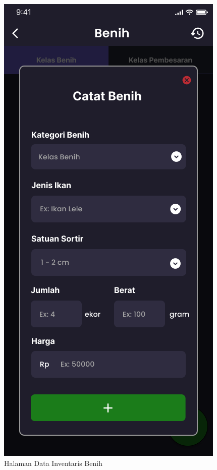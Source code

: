 \begin{enumerate}
\begin{enumerate}
\begin{figure}[H]
			  \caption{Halaman Data Inventaris Benih}
			\endminipage\hfill
			  \includegraphics[width=\linewidth]{gambar/sprint1/mockup_input_seed.png}

\end{figure}
\end{enumerate}
\end{enumerate}
